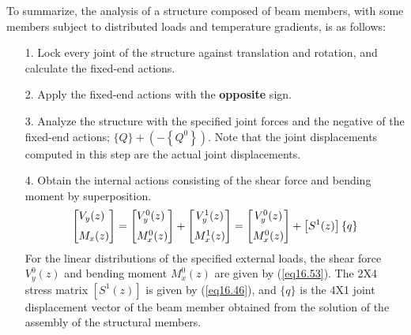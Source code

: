 \documentclass{AeroStructure-ERJohnson}
\begin{document}
To summarize, the analysis of a structure composed of beam members, with some members subject to distributed loads and temperature gradients, is as follows:
\begin{enumerate}
\item[1.] Lock every joint of the structure against translation and rotation, and calculate the fixed-end actions.

\item[2.] Apply the fixed-end actions with the \textbf{opposite} sign.

\item[3.] Analyze the structure with the specified joint forces and the negative of the fixed-end actions; $\{Q\}+\left(-\left\{Q^{0}\right\}\right)$. Note that the joint displacements computed in this step are the actual joint displacements.

\item[4.] Obtain the internal actions consisting of the shear force and bending moment by superposition.
\begin{align}\label{eq16.61}
\left[\begin{array}{@{}l@{}}V_{y}(z) \\[6pt]M_{x}(z)\end{array}\right]=\left[\begin{array}{@{}l@{}}V_{y}^{0}(z) \\[6pt]M_{x}^{0}(z)\end{array}\right]+\left[\begin{array}{@{}c@{}}V_{y}^{1}(z) \\[6pt]M_{x}^{1}(z)\end{array}\right]=\left[\begin{array}{@{}c@{}}V_{y}^{0}(z) \\[6pt]M_{x}^{0}(z)\end{array}\right]+\left[S^{1}(z)\right]\{q\}
\end{align}
For the linear distributions of the specified external loads, the shear force $V_{y}^{0}(z)$ and bending moment $M_{x}^{0}(z)$ are given by (\ref{eq16.53}). The 2X4 stress matrix $\left[S^{1}(z)\right]$ is given by (\ref{eq16.46}), and $\{q\}$ is the 4X1 joint displacement vector of the beam member obtained from the solution of the assembly of the structural members.
\end{enumerate}
\end{document}

